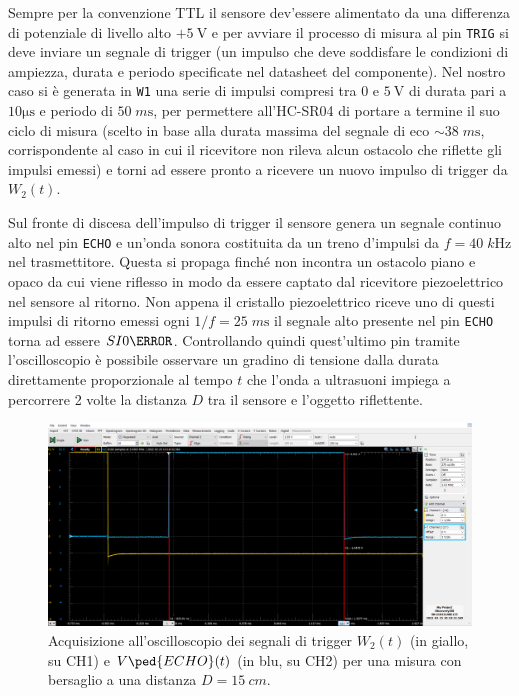 \documentclass[10pt, a4paper, italian]{article}
\begin{document}
Sempre per la convenzione TTL il sensore dev'essere alimentato da una
differenza di potenziale di livello alto $+\SI{5}{\V}$ e per avviare il
processo di misura al pin \verb+TRIG+ si deve inviare un segnale di trigger
(un impulso che deve soddisfare le condizioni di ampiezza, durata e periodo
specificate nel datasheet del componente). Nel nostro caso si è generata in
\verb+W1+ una serie di impulsi compresi tra 0 e $\SI{5}{\V}$ di durata pari a
$10 \si{\micro\s}$ e periodo di $50 \; \si{m\s}$, per permettere all'HC-SR04
di portare a termine il suo ciclo di misura (scelto in base alla durata
massima del segnale di eco $\sim 38 \; \si{m\s}$, corrispondente al caso in
cui il ricevitore non rileva alcun ostacolo che riflette gli impulsi emessi)
e torni ad essere pronto a ricevere un nuovo impulso di trigger da $W_2 (t)$.

Sul fronte di discesa dell'impulso di trigger il sensore genera un segnale
continuo alto nel pin \verb+ECHO+ e un'onda sonora costituita da un treno
d'impulsi da $f = 40 \; \si{k\Hz}$ nel trasmettitore.
Questa si propaga finché non incontra un ostacolo piano e opaco da cui viene
riflesso in modo da essere captato dal ricevitore piezoelettrico nel sensore
al ritorno. Non appena il cristallo piezoelettrico riceve uno di questi
impulsi di ritorno emessi ogni $1/f = 25 \; \si{m\s}$ il segnale alto presente
nel pin \verb+ECHO+ torna ad essere $SI{0}{\V}$. Controllando quindi
quest'ultimo pin tramite l'oscilloscopio è possibile osservare un gradino di
tensione dalla durata direttamente proporzionale al tempo $t$ che l'onda a
ultrasuoni impiega a percorrere 2 volte la distanza $D$ tra il sensore e
l'oggetto riflettente.
\begin{figure}[htbp]
    \centering
	\includegraphics[scale=0.4]{echo}
    \caption{Acquisizione all'oscilloscopio dei segnali di trigger $W_2 (t)$
    (in giallo, su CH1) e $V\ped{ECHO} (t)$ (in blu, su CH2) per una misura
    con bersaglio a una distanza $D = \SI{15}{cm}$.}
\end{figure}
\end{document}
